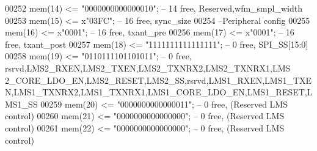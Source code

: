 \begin{DoxyCode}
00252             \textcolor{vhdlchar}{mem}\textcolor{vhdlchar}{(}\textcolor{vhdllogic}{}\textcolor{vhdllogic}{14}\textcolor{vhdlchar}{)} \textcolor{vhdlchar}{<=} \textcolor{vhdllogic}{"0000000000000010"};\textcolor{keyword}{ -- 14 free, Reserved,wfm\_smpl\_width}
00253             \textcolor{vhdlchar}{mem}\textcolor{vhdlchar}{(}\textcolor{vhdllogic}{}\textcolor{vhdllogic}{15}\textcolor{vhdlchar}{)} \textcolor{vhdlchar}{<=} \textcolor{vhdlchar}{x}\textcolor{vhdllogic}{"03FC"};\textcolor{keyword}{               -- 16 free, sync\_size}
00254 \textcolor{keyword}{            --Peripheral config}
00255             \textcolor{vhdlchar}{mem}\textcolor{vhdlchar}{(}\textcolor{vhdllogic}{}\textcolor{vhdllogic}{16}\textcolor{vhdlchar}{)} \textcolor{vhdlchar}{<=} \textcolor{vhdlchar}{x}\textcolor{vhdllogic}{"0001"};\textcolor{keyword}{               -- 16 free, txant\_pre}
00256             \textcolor{vhdlchar}{mem}\textcolor{vhdlchar}{(}\textcolor{vhdllogic}{}\textcolor{vhdllogic}{17}\textcolor{vhdlchar}{)} \textcolor{vhdlchar}{<=} \textcolor{vhdlchar}{x}\textcolor{vhdllogic}{"0001"};\textcolor{keyword}{               -- 16 free, txant\_post}
00257             \textcolor{vhdlchar}{mem}\textcolor{vhdlchar}{(}\textcolor{vhdllogic}{}\textcolor{vhdllogic}{18}\textcolor{vhdlchar}{)}  \textcolor{vhdlchar}{<=} \textcolor{vhdllogic}{"1111111111111111"};\textcolor{keyword}{ --  0 free, SPI\_SS[15:0]}
00258             \textcolor{vhdlchar}{mem}\textcolor{vhdlchar}{(}\textcolor{vhdllogic}{}\textcolor{vhdllogic}{19}\textcolor{vhdlchar}{)} \textcolor{vhdlchar}{<=} \textcolor{vhdllogic}{"0110111101101011"};\textcolor{keyword}{ --  0 free,
       rsrvd,LMS2\_RXEN,LMS2\_TXEN,LMS2\_TXNRX2,LMS2\_TXNRX1,LMS
      2\_CORE\_LDO\_EN,LMS2\_RESET,LMS2\_SS,rsrvd,LMS1\_RXEN,LMS1\_TXEN,LMS1\_TXNRX2,LMS1\_TXNRX1,LMS1\_CORE\_LDO\_EN,LMS1\_RESET,LMS1\_SS}
00259             \textcolor{vhdlchar}{mem}\textcolor{vhdlchar}{(}\textcolor{vhdllogic}{}\textcolor{vhdllogic}{20}\textcolor{vhdlchar}{)} \textcolor{vhdlchar}{<=} \textcolor{vhdllogic}{"0000000000000011"};\textcolor{keyword}{ --  0 free, (Reserved LMS control)}
00260             \textcolor{vhdlchar}{mem}\textcolor{vhdlchar}{(}\textcolor{vhdllogic}{}\textcolor{vhdllogic}{21}\textcolor{vhdlchar}{)} \textcolor{vhdlchar}{<=} \textcolor{vhdllogic}{"0000000000000000"};\textcolor{keyword}{ --  0 free, (Reserved LMS control)}
00261             \textcolor{vhdlchar}{mem}\textcolor{vhdlchar}{(}\textcolor{vhdllogic}{}\textcolor{vhdllogic}{22}\textcolor{vhdlchar}{)} \textcolor{vhdlchar}{<=} \textcolor{vhdllogic}{"0000000000000000"};\textcolor{keyword}{ --  0 free, (Reserved LMS control)}

\end{DoxyCode}
